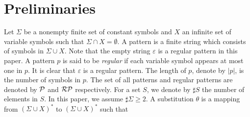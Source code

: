\section{Preliminaries}

Let $\Sigma$ be a nonempty finite set of constant symbols and
$X$ an infinite set of variable symbols such that $\Sigma \cap X = \emptyset$.
A pattern is a finite string which consists of symbols in $\Sigma \cup X$.
Note that the empty string $\varepsilon$ is a regular pattern in this paper.
A pattern $p$ is said to be \textit{regular} if each variable symbol appears
at most one in $p$.
It is clear that $\varepsilon$ is a regular pattern.
The length of $p$, denote by $|p|$, is the number of symbols in $p$.
The set of all patterns and regular patterns are denoted by $\mathcal{P}$ and $\mathcal{RP}$ respectively.
For a set $S$, we denote by $\sharp S$ the number of elements in $S$.
In this paper, we assume $\sharp \Sigma \geq 2$.
%
%
%
A substitution $\theta$ is a mapping from $(\Sigma \cup X)^{\ast}$ to $(\Sigma \cup X)^{\ast}$ such that
